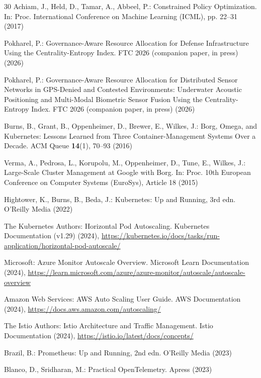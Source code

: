 \documentclass[runningheads]{llncs}
\begin{document}
\begin{thebibliography}{30}
 Achiam, J., Held, D., Tamar, A., Abbeel, P.: Constrained Policy Optimization. In: Proc. International Conference on Machine Learning (ICML), pp. 22--31 (2017)

 Pokharel, P.: Governance-Aware Resource Allocation for Defense Infrastructure Using the Centrality-Entropy Index. FTC 2026 (companion paper, in press) (2026)

 Pokharel, P.: Governance-Aware Resource Allocation for Distributed Sensor Networks in GPS-Denied and Contested Environments: Underwater Acoustic Positioning and Multi-Modal Biometric Sensor Fusion Using the Centrality-Entropy Index. FTC 2026 (companion paper, in press) (2026)

 Burns, B., Grant, B., Oppenheimer, D., Brewer, E., Wilkes, J.: Borg, Omega, and Kubernetes: Lessons Learned from Three Container-Management Systems Over a Decade. ACM Queue \textbf{14}(1), 70--93 (2016)

 Verma, A., Pedrosa, L., Korupolu, M., Oppenheimer, D., Tune, E., Wilkes, J.: Large-Scale Cluster Management at Google with Borg. In: Proc. 10th European Conference on Computer Systems (EuroSys), Article 18 (2015)

 Hightower, K., Burns, B., Beda, J.: Kubernetes: Up and Running, 3rd edn. O'Reilly Media (2022)

 The Kubernetes Authors: Horizontal Pod Autoscaling. Kubernetes Documentation (v1.29) (2024), \url{https://kubernetes.io/docs/tasks/run-application/horizontal-pod-autoscale/}

 Microsoft: Azure Monitor Autoscale Overview. Microsoft Learn Documentation (2024), \url{https://learn.microsoft.com/azure/azure-monitor/autoscale/autoscale-overview}

 Amazon Web Services: AWS Auto Scaling User Guide. AWS Documentation (2024), \url{https://docs.aws.amazon.com/autoscaling/}

 The Istio Authors: Istio Architecture and Traffic Management. Istio Documentation (2024), \url{https://istio.io/latest/docs/concepts/}

 Brazil, B.: Prometheus: Up and Running, 2nd edn. O'Reilly Media (2023)

 Blanco, D., Sridharan, M.: Practical OpenTelemetry. Apress (2023)


\end{thebibliography}
\end{document}
